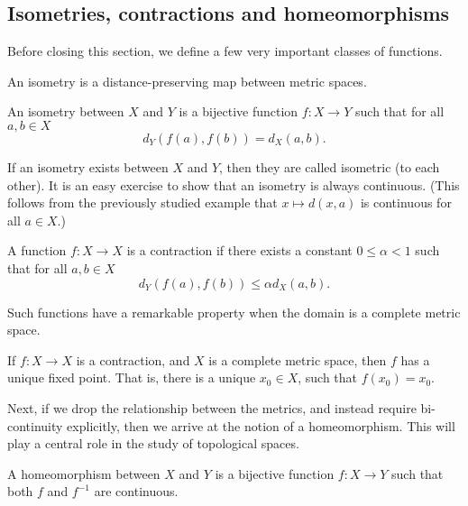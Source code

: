 

\subsection{Isometries, contractions and homeomorphisms}
Before closing this section, we define a few very important classes of functions.

An isometry is a distance-preserving map between metric spaces.
\begin{ndfn}[Isometry]
  An isometry between $X$ and $Y$ is a bijective function $f:X \to Y$ such that for all $a,b \in X$
  \begin{equation*}
    d_{Y}(f(a), f(b)) = d_{X}(a, b).
  \end{equation*}
\end{ndfn}
If an isometry exists between $X$ and $Y$, then they are called isometric (to each other). It is an easy exercise to show that an isometry is always continuous. (This follows from the previously studied example that $x \mapsto d(x,a)$ is continuous for all $a \in X$.)

\begin{ndfn}[Contraction]
  A function $f:X \to X$ is a contraction if there exists a constant $0 \leq \alpha < 1$ such that for all $a,b \in X$
  \begin{equation*}
    d_{Y}(f(a), f(b)) \leq \alpha d_{X}(a, b).
  \end{equation*}
\end{ndfn}
Such functions have a remarkable property when the domain is a complete metric space.
\begin{nthm}
  If $f: X \to X$ is a contraction, and $X$ is a complete metric space, then $f$ has a unique fixed point. That is, there is a unique $x_0 \in X$, such that $f(x_0) = x_0$.
\end{nthm}

Next, if we drop the relationship between the metrics, and instead require bi-continuity explicitly, then we arrive at the notion of a homeomorphism. This will play a central role in the study of topological spaces.
\begin{ndfn}[Homeomorphism]
  A homeomorphism between $X$ and $Y$ is a bijective function $f:X \to Y$ such that both $f$ and $f^{-1}$ are continuous.
\end{ndfn}

